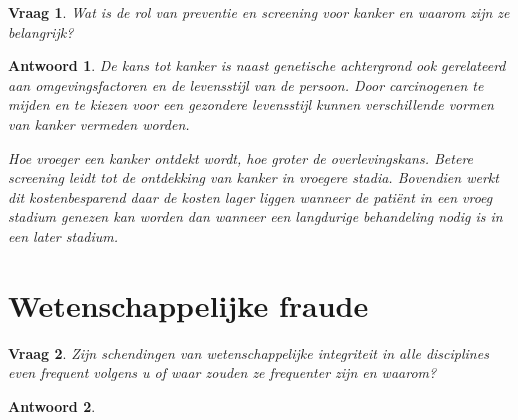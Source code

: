 \documentclass{article}
\theoremstyle{plain}
\newtheorem{question}{Vraag}
\theoremstyle{nonumberplain}
\newtheorem{answer}{Antwoord}
\begin{document}
\begin{question}
Wat is de rol van preventie en screening voor kanker en waarom zijn ze
belangrijk?
\end{question}

\begin{answer}

De kans tot kanker is naast genetische achtergrond ook gerelateerd aan
omgevingsfactoren en de levensstijl van de persoon. Door carcinogenen te mijden
en te kiezen voor een gezondere levensstijl kunnen verschillende vormen van
kanker vermeden worden.

Hoe vroeger een kanker ontdekt wordt, hoe groter de overlevingskans. Betere
\emph{screening} leidt tot de ontdekking van kanker in vroegere stadia.
Bovendien werkt dit kostenbesparend daar de kosten lager liggen wanneer de
patiënt in een vroeg stadium genezen kan worden dan wanneer een langdurige
behandeling nodig is in een later stadium.

\end{answer}

\section{Wetenschappelijke fraude}

\begin{question}
Zijn schendingen van wetenschappelijke integriteit in alle disciplines even
frequent volgens u of waar zouden ze frequenter zijn en waarom?
\end{question}

\begin{answer}

\end{answer}
\end{document}
